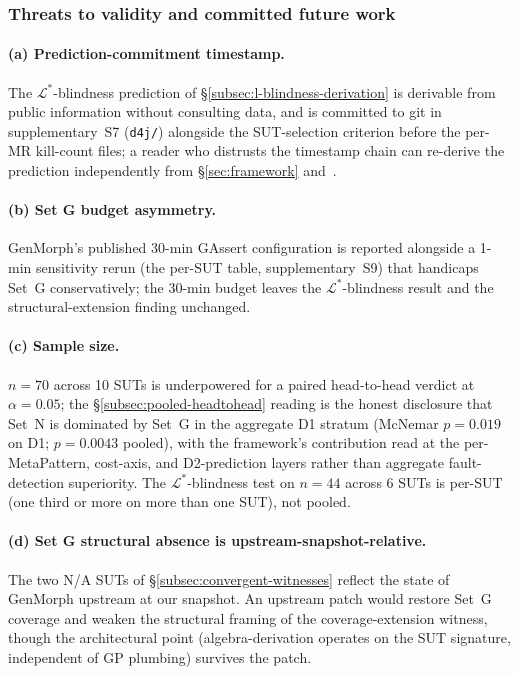 \documentclass[acmsmall,screen,review]{acmart}
\begin{document}
\subsubsection{Threats to validity and committed future work}
\label{subsec:empirical-threats}

\paragraph{(a) Prediction-commitment timestamp.}
The $\mathcal{L}^{*}$-blindness prediction of \S\ref{subsec:l-blindness-derivation} is derivable from public information without consulting data, and is committed to git in supplementary~S7 (\texttt{d4j/}) alongside the SUT-selection criterion before the per-MR kill-count files; a reader who distrusts the timestamp chain can re-derive the prediction independently from \S\ref{sec:framework} and~\cite{Coles2016PIT}.

\paragraph{(b) Set G budget asymmetry.}
GenMorph's published 30-min GAssert configuration is reported alongside a 1-min sensitivity rerun (the per-SUT table, supplementary~S9) that handicaps Set~G conservatively; the 30-min budget leaves the $\mathcal{L}^{*}$-blindness result and the structural-extension finding unchanged.

\paragraph{(c) Sample size.}
$n = 70$ across 10 SUTs is underpowered for a paired head-to-head verdict at $\alpha = 0.05$; the \S\ref{subsec:pooled-headtohead} reading is the honest disclosure that Set~N is dominated by Set~G in the aggregate D1 stratum (McNemar $p = 0.019$ on D1; $p = 0.0043$ pooled), with the framework's contribution read at the per-MetaPattern, cost-axis, and D2-prediction layers rather than aggregate fault-detection superiority. The $\mathcal{L}^{*}$-blindness test on $n = 44$ across 6 SUTs is per-SUT (one third or more on more than one SUT), not pooled.

\paragraph{(d) Set G structural absence is upstream-snapshot-relative.}
The two N/A SUTs of \S\ref{subsec:convergent-witnesses} reflect the state of GenMorph upstream at our snapshot. An upstream patch would restore Set~G coverage and weaken the structural framing of the coverage-extension witness, though the architectural point (algebra-derivation operates on the SUT signature, independent of GP plumbing) survives the patch.
\end{document}
